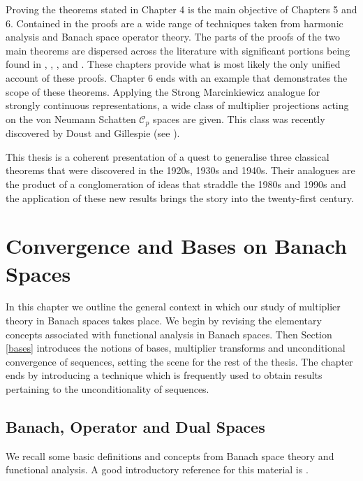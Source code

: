 \documentclass[12pt]{UNSWthesis}
\newcommand{\CC}{\mathcal{C}}
\numberwithin{equation}{section}
\begin{document}
Proving the theorems stated in Chapter 4 is the main objective of 
Chapters 5 and 6. Contained in the proofs are a wide range of techniques
taken from harmonic analysis and Banach space operator theory. 
The parts of the proofs of the two main theorems are dispersed across the 
literature with significant portions being found in
\cite{BBG}, \cite{BG Fourier}, \cite{BG Spectral}, \cite{BGM} and \cite{Bourg}.
These chapters provide what is most likely the only unified account of these
proofs. Chapter 6 ends
with an example that demonstrates the scope of these theorems. Applying the
Strong Marcinkiewicz analogue for strongly continuous representations, a wide
class of multiplier
projections acting on the von Neumann Schatten $\CC_p$ spaces are given. This
class was recently discovered by Doust and Gillespie (see \cite{DG}).

This thesis is a coherent presentation of a quest to generalise three classical
theorems that were discovered in the 1920s, 1930s and 1940s. Their analogues are
the product of a conglomeration of ideas that straddle the 1980s and 1990s and
the application of these new results brings the story into the twenty-first
century.




\chapter{Convergence and Bases on Banach Spaces}



In this chapter we outline the general context in which our study of multiplier
theory in Banach spaces
takes place. We begin by revising the elementary concepts
associated with functional analysis in Banach spaces. Then Section \ref{bases}
introduces the notions of bases, multiplier transforms and unconditional
convergence of sequences, setting the scene for the rest of the thesis. The 
chapter ends by introducing a technique which is frequently used to obtain 
results pertaining to the unconditionality of sequences.


\section{Banach, Operator and Dual Spaces}\label{Banach Spaces}

We recall some basic definitions and concepts from Banach space theory and
functional analysis. A good introductory reference for this material is 
\cite{Con}.
\end{document}
